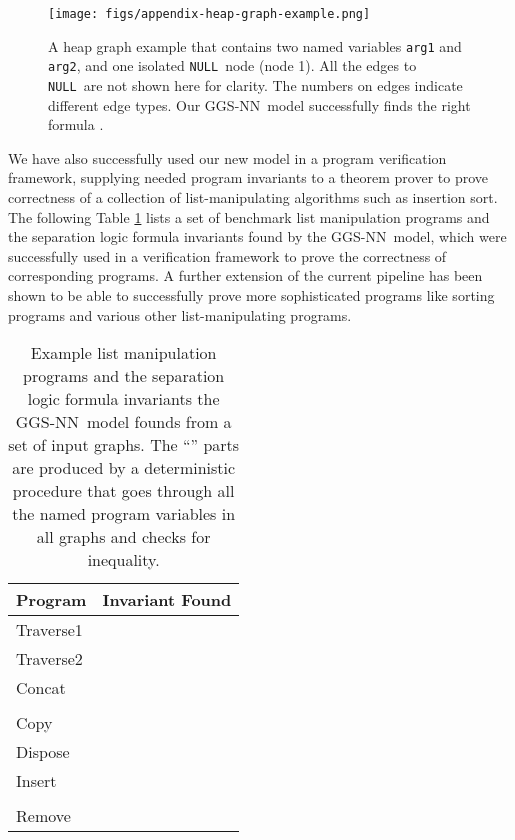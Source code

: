 \documentclass{article} \usepackage{iclr2016_conference,times}
\newcommand{\SLnull}{\texttt{NULL}}
\newcommand{\OurMethodShort}{GGS-NN}
\begin{document}
\begin{figure}
    \begin{center}
        \texttt{[image: figs/appendix-heap-graph-example.png]}
    \end{center}
    \caption{A heap graph example that contains two named variables
        \texttt{arg1} and \texttt{arg2}, and one isolated \SLnull~node (node 1). All the
    edges to \SLnull~are not shown here for clarity. The numbers on edges
    indicate different edge types.  Our \OurMethodShort~model successfully
    finds the right
formula .}
    \label{fig:appendix-heap-graph-example}
\end{figure}


We have also successfully used our new model in a program verification
framework, supplying needed program invariants to a theorem prover to prove
correctness of a collection of list-manipulating algorithms such as insertion
sort.
The following Table \ref{table:seplogic-list-invariants} lists a set of benchmark list manipulation programs and
the separation logic formula invariants found by the \OurMethodShort~model,
which were successfully used in a verification framework to prove the
correctness of corresponding programs. A further extension of the current
pipeline has been shown to be able to successfully prove more sophisticated
programs like sorting programs and various other list-manipulating programs.

\begin{table}
\begin{center}
\begin{tabular}{ll}
\toprule
Program & Invariant Found \\
\midrule
Traverse1 &  \\
Traverse2 &  \\
Concat &  \\
&  \\
Copy &  \\
Dispose &  \\
Insert &  \\
&  \\
Remove &  \\
\bottomrule
\end{tabular}
\caption{Example list manipulation programs and the separation logic formula
invariants the \OurMethodShort~model founds from a set of input graphs. The
``'' parts are produced by
a deterministic procedure that goes through all the named program variables in
all graphs and checks for inequality.}
\label{table:seplogic-list-invariants}
\end{center}
\end{table}
\end{document}
